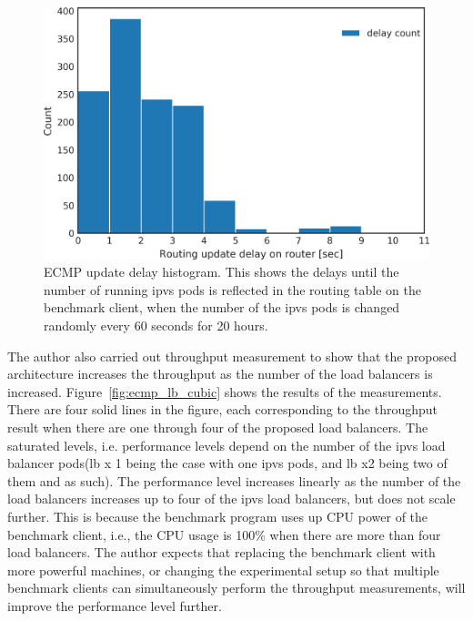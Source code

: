 \begin{figure}[h]
  \centering
  \includegraphics[width=0.9\columnwidth]{Figs/ecmp_delay_histgram}
  \par\bigskip
  \centering
  \begin{minipage}{0.9\columnwidth}
    \caption[ECMP update delay histogram]{
      ECMP update delay histogram.
      This shows the delays until the number of running ipvs pods is reflected in the routing table on the benchmark client, when the number of the ipvs pods is changed randomly every 60 seconds for 20 hours.
    }
    \label{fig:ecmp_delay_histgram}
  \end{minipage}
\end{figure}

The author also carried out throughput measurement to show that the proposed architecture increases the throughput as the number of the load balancers is increased.
Figure~\ref{fig:ecmp_lb_cubic} shows the results of the measurements.
There are four solid lines in the figure, each corresponding to the throughput result when there are one through four of the proposed load balancers.
The saturated levels, i.e. performance levels depend on the number of the ipvs load balancer pods(lb x 1 being the case with one ipvs pods, and lb x2 being two of them and as such). 
The performance level increases linearly as the number of the load balancers increases up to four of the ipvs load balancers, but does not scale further.
This is because the benchmark program uses up CPU power of the benchmark client, i.e., the CPU usage is 100\% when there are more than four load balancers.
The author expects that replacing the benchmark client with more powerful machines, or changing the experimental setup so that multiple benchmark clients can simultaneously perform the throughput measurements, will improve the performance level further.

